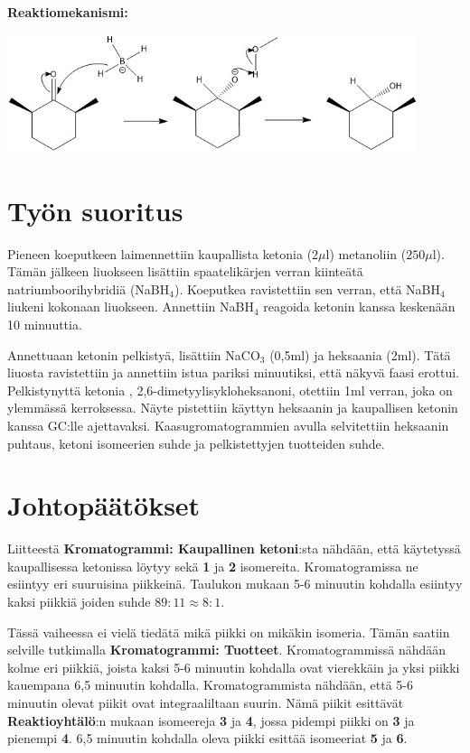 \documentclass[11pt,a4paper]{article}
\begin{document}
\noindent \textbf{Reaktiomekanismi:}

\vspace{0.3cm}

\includegraphics[height = 3.5cm, width = 12cm]{mikroskaalmekanismi.jpg}

\vspace{0.3cm}

\section{Työn suoritus}

\noindent Pieneen koeputkeen laimennettiin kaupallista ketonia ($2 \mu$l) metanoliin ($250 \mu$l). Tämän jälkeen liuokseen lisättiin spaatelikärjen verran kiinteätä natriumboorihybridiä (NaBH$_4$). Koeputkea ravistettiin sen verran, että NaBH$_4$ liukeni kokonaan liuokseen. Annettiin NaBH$_4$ reagoida ketonin kanssa keskenään 10 minuuttia. 

Annettuaan ketonin pelkistyä, lisättiin NaCO$_3$ (0,5ml) ja heksaania (2ml). Tätä liuosta ravistettiin ja annettiin istua pariksi minuutiksi, että näkyvä faasi erottui. Pelkistynyttä ketonia , 2,6-dimetyylisykloheksanoni, otettiin 1ml verran, joka on ylemmässä kerroksessa. Näyte pistettiin käyttyn heksaanin ja kaupallisen ketonin kanssa GC:lle ajettavaksi. Kaasugromatogrammien avulla selvitettiin heksaanin puhtaus, ketoni isomeerien suhde ja pelkistettyjen tuotteiden suhde. 


\section{Johtopäätökset}

Liitteestä \textbf{Kromatogrammi: Kaupallinen ketoni}:sta nähdään, että käytetyssä kaupallisessa ketonissa löytyy sekä \textbf{1} ja \textbf{2} isomereita. Kromatogramissa ne esiintyy eri suuruisina piikkeinä. Taulukon mukaan 5-6 minuutin kohdalla esiintyy kaksi piikkiä joiden suhde $89:11 \approx 8:1$. 

Tässä vaiheessa ei vielä tiedätä mikä piikki on mikäkin isomeria. Tämän saatiin selville tutkimalla \textbf{Kromatogrammi: Tuotteet}. Kromatogrammissä nähdään kolme eri piikkiä, joista kaksi 5-6 minuutin kohdalla ovat vierekkäin ja yksi piikki kauempana 6,5 minuutin kohdalla. Kromatogrammista nähdään, että 5-6 minuutin olevat piikit ovat integraaliltaan suurin. Nämä piikit esittävät \textbf{Reaktioyhtälö}:n mukaan isomeereja \textbf{3} ja \textbf{4}, jossa pidempi piikki on \textbf{3} ja pienempi \textbf{4}. 6,5 minuutin kohdalla oleva piikki esittää isomeeriat \textbf{5} ja \textbf{6}.
\end{document}
